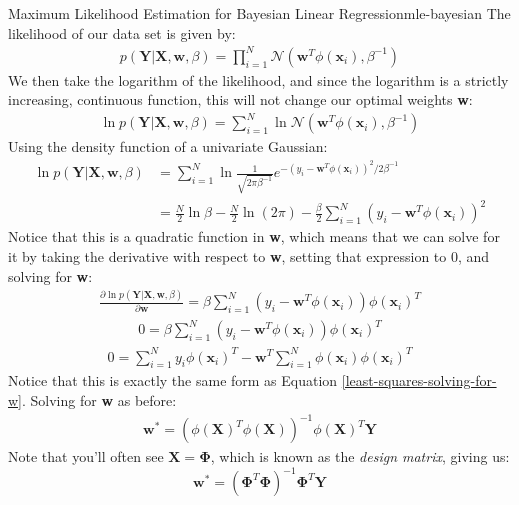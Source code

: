 \begin{derivation}{Maximum Likelihood Estimation for Bayesian Linear Regression}{mle-bayesian}
    The likelihood of our data set is given by:
    \begin{align*}
        p(\textbf{Y} | \textbf{X}, \textbf{w}, \beta) = \prod_{i=1}^{N} \mathcal{N}(\textbf{w}^{T}\phi(\textbf{x}_{i}), \beta^{-1})
    \end{align*}
    We then take the logarithm of the likelihood, and since the logarithm is a strictly increasing, continuous function, this will not change our optimal weights \textbf{w}:
    \begin{align*}
        \ln{p(\textbf{Y} | \textbf{X}, \textbf{w}, \beta)} = \sum_{i=1}^{N} \ln{\mathcal{N}(\textbf{w}^{T}\phi(\textbf{x}_{i}), \beta^{-1})}
    \end{align*}
    Using the density function of a univariate Gaussian:
    \begin{align*}
        \ln{p(\textbf{Y} | \textbf{X}, \textbf{w}, \beta)} &= \sum_{i=1}^{N} \ln{\frac{1}{\sqrt{2\pi\beta^{-1}}} e^{-(y_{i} - \textbf{w}^{T}\phi(\textbf{x}_{i}))^2 / 2\beta^{-1}}} \\
        &= \frac{N}{2}\ln{\beta} - \frac{N}{2}\ln{(2\pi)} - \frac{\beta}{2} \sum_{i=1}^{N} (y_{i} - \textbf{w}^{T}\phi(\textbf{x}_{i}))^2
    \end{align*}
    Notice that this is a quadratic function in \textbf{w}, which means that we can solve for it by taking the derivative with respect to \textbf{w}, setting that expression to 0, and solving for \textbf{w}:
    \begin{align*}
        \frac{\partial \ln{p(\textbf{Y} | \textbf{X}, \textbf{w}, \beta)}}{\partial \textbf{w}} = \beta \sum_{i=1}^{N} (y_{i} - \textbf{w}^{T}\phi(\textbf{x}_{i}))\phi(\textbf{x}_{i})^{T}
    \end{align*}
    \begin{align*}
        0 = \beta \sum_{i=1}^{N} (y_{i} - \textbf{w}^{T}\phi(\textbf{x}_{i}))\phi(\textbf{x}_{i})^{T}
    \end{align*}
    \begin{align*}
        0 = \sum_{i=1}^{N} y_{i}\phi(\textbf{x}_{i})^{T} - \textbf{w}^{T} \sum_{i=1}^{N} \phi(\textbf{x}_{i})\phi(\textbf{x}_{i})^{T}
    \end{align*}
    Notice that this is exactly the same form as Equation \ref{least-squares-solving-for-w}. Solving for \textbf{w} as before:
    \begin{align*}
        \textbf{w}^{*} = (\phi(\textbf{X})^{T}\phi(\textbf{X}))^{-1}\phi(\textbf{X})^{T}\textbf{Y}
    \end{align*}
    Note that you'll often see $\textbf{X} = \boldsymbol{\Phi}$, which is known as the \textit{design matrix}, giving us:
    \begin{equation} \label{bayesian-solved-for-w}
        \textbf{w}^{*} = (\boldsymbol{\Phi}^{T}\boldsymbol{\Phi})^{-1}\boldsymbol{\Phi}^{T}\textbf{Y}
    \end{equation}
\end{derivation}

